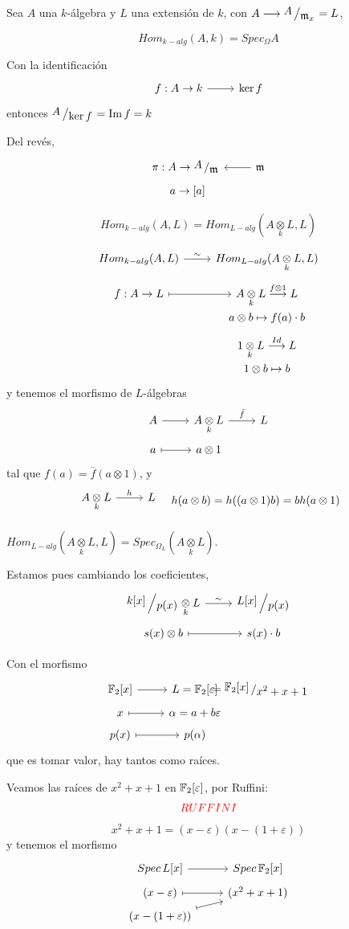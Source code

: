 Sea $A$ una $k$-\'algebra y $L$ una extensi\'on de $k$, con $A \longrightarrow \modulo{A}{\m_x}=L$,
\begin{lem}
$$Hom_{k-alg} (A,k) = Spec_{\Omega} A$$
\end{lem}
\begin{dem}
    Con la identificaci\'on
    $$\bt f:A\to k \rar & \ker f \et$$
    entonces $\modulo{A}{\ker f} = \Im f = k$

    Del rev\'es, 
    $$\bt \pi: A \to \modulo{A}{\m} & \arrow{l} \m  \\[-5mm] \, \, a \to [a] \et$$
\end{dem}
\begin{custom}
$$Hom_{k-alg} (A,L) = Hom_{L-alg}(A \underset{k}{\otimes} L , L)$$
\end{custom}
\begin{dem}
    $$\bt Hom_{k-alg} (A,L) \rar{\sim} & Hom_{L-alg}(A \underset{k}{\otimes} L , L) \\[-5mm]  f:A\to L \rarmaps & A\underset{k}{\otimes} L \overset{f\otimes 1}{\longrightarrow} L \\[-7mm] \, & a\otimes b \mapsto f(a) \cdot b \\[-5mm] & 1 \underset{k}{\otimes} L \overset{Id}{\longrightarrow} L \\[-7mm] \, & 1\otimes  b \mapsto b \et$$
     y tenemos el morfismo de $L$-\'algebras
     $$\bt A \rar & A \underset{k}{\otimes} L \rar{\bar f} & L \\[-5mm] a \rarmaps & a\otimes 1 \et$$
     tal que $f(a)=\bar f(a\otimes 1)$, y 
     $$\bt A \underset{k}{\otimes} L \rar{h} & L \\[-5mm] \et \quad h(a\otimes b) = h((a\otimes 1) b) = bh(a\otimes 1) $$
\end{dem}
\begin{cor}
    $Hom_{L-alg}(A \underset{k}{\otimes} L , L) = Spec_{\Omega_L} (A \underset{k}{\otimes} L)$. 
\end{cor}
\begin{obs}
    Estamos pues cambiando los coeficientes, 
    $$\bt \modulo{k[x]}{p(x)} \underset{k}{\otimes}L \rar{\sim} & \modulo{L{[x]}}{p(x)} \\[-5mm] s(x) \otimes b \rarmaps & s(x)\cdot b \et$$
\end{obs}
\begin{ejem} Con el morfismo
    $$\bt \bb F_2{[x]} \rar & L = \bb F_2{[\varepsilon]} &[-14mm] = \modulo{\bb F_2[x]}{x^2+x+1} \\[-5mm] x \rarmaps & \alpha = a+b \varepsilon \\[-5mm] p(x) \rarmaps & p(\alpha) \et$$
    que es tomar valor, hay tantos como ra\'ices. 

    Veamos las ra\'ices de $x^2+x+1$ en $\mathbb{F}_2[\varepsilon]$, por Ruffini:
    $$\textcolor{red}{RUFFINI}$$
    $$x^2+x+1 = (x-\varepsilon ) (x-(1+\varepsilon))$$
    y tenemos el morfismo
    $$\bt Spec\, L[x] \rar & Spec \, \bb F_2[x] \\[-5mm] (x-\varepsilon) \rarmaps & (x^2+x+1) \\[-5mm] (x-(1+\varepsilon)) \arrow[mapsto]{ru} \et$$
\end{ejem}

